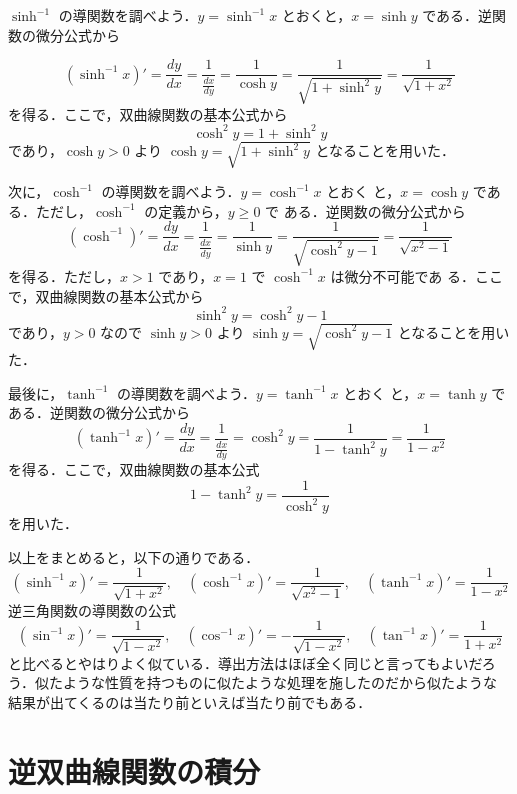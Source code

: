 \documentclass[dvipdfmx,12pt, uplatex]{jsarticle}
\begin{document}
$\sinh^{-1}$ の導関数を調べよう．$y=\sinh^{-1}x$ とおくと，$x=\sinh y$
である．逆関数の微分公式から

\[
  \left(\sinh^{-1} x\right)'= \frac{dy}{dx} = \frac{1}{\frac{dx}{dy}} = \frac{1}{\cosh y} =
  \frac{1}{\sqrt{1+\sinh^2 y}} = \frac{1}{\sqrt{1+x^2}}
\]
を得る．ここで，双曲線関数の基本公式から
\[
\cosh^2 y =1+ \sinh^2 y
\]
であり，$\cosh y>0$ より $\cosh y = \sqrt{1+\sinh^2 y}$ となることを用いた．

次に，$\cosh^{-1}$ の導関数を調べよう．$y=\cosh^{-1}x$ とおく
と，$x=\cosh y$ である．ただし，$\cosh^{-1}$ の定義から，$y \geq 0$ で
ある．逆関数の微分公式から
\[
  \left( \cosh^{-1}\right)' = \frac{dy}{dx} = \frac{1}{\frac{dx}{dy}}
  = \frac{1}{\sinh y} = \frac{1}{\sqrt{\cosh^2 y -1}} =
  \frac{1}{\sqrt{x^2-1}}
\]
を得る．ただし，$x>1$ であり，$x=1$ で $\cosh^{-1}x$ は微分不可能であ
る．ここで，双曲線関数の基本公式から
\[
\sinh^2 y = \cosh^2 y -1
\]
であり，$y > 0$ なので $\sinh y > 0$ より $\sinh y = \sqrt{\cosh^2
  y-1}$ となることを用いた．

最後に，$\tanh^{-1}$ の導関数を調べよう．$y=\tanh^{-1} x$ とおく
と，$x=\tanh y$ である．逆関数の微分公式から
\[
  \left( \tanh^{-1} x \right)' = \frac{dy}{dx} =
  \frac{1}{\frac{dx}{dy}} = \cosh^2 y = \frac{1}{1-\tanh^2 y} = \frac{1}{1-x^2}
\]
を得る．ここで，双曲線関数の基本公式
\[
1- \tanh^2 y = \frac{1}{\cosh^2 y}
\]
を用いた．

以上をまとめると，以下の通りである．
\[
\left( \sinh^{-1} x \right)' = \frac{1}{\sqrt{1+x^2}}, \quad 
\left( \cosh^{-1} x \right)' = \frac{1}{\sqrt{x^2-1}}, \quad
\left( \tanh^{-1} x \right)' = \frac{1}{1-x^2}
\]
逆三角関数の導関数の公式
\[
\left( \sin^{-1} x \right)' = \frac{1}{\sqrt{1-x^2}}, \quad
\left( \cos^{-1} x \right)' = -\frac{1}{\sqrt{1-x^2}}, \quad
\left( \tan^{-1} x \right)' = \frac{1}{1+x^2}
\]
と比べるとやはりよく似ている．導出方法はほぼ全く同じと言ってもよいだろ
う．似たような性質を持つものに似たような処理を施したのだから似たような
結果が出てくるのは当たり前といえば当たり前でもある．

\section{逆双曲線関数の積分}
\end{document}
